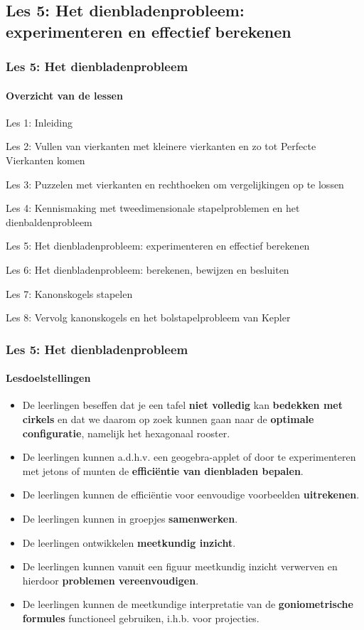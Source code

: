 \documentclass[dutch]{beamer}
\begin{document}
\subsection{Les 5: Het dienbladenprobleem: experimenteren en effectief berekenen}
\begin{frame}
\frametitle{Les 5: Het dienbladenprobleem}
\framesubtitle{Overzicht van de lessen}
\begin{list}{\quad}{}
\item Les 1: Inleiding
\item Les 2: Vullen van vierkanten met kleinere vierkanten en zo tot Perfecte Vierkanten komen
\item Les 3: Puzzelen met vierkanten en rechthoeken om vergelijkingen op te lossen
\item Les 4: Kennismaking met tweedimensionale stapelproblemen en het dienbaldenprobleem 
\item {\color{blue}Les 5: Het dienbladenprobleem: experimenteren en effectief berekenen}
\item Les 6: Het dienbladenprobleem: berekenen, bewijzen en besluiten
\item Les 7: Kanonskogels stapelen
\item Les 8: Vervolg kanonskogels en het bolstapelprobleem van Kepler
\end{list}
\end{frame}

\begin{frame}
\frametitle{Les 5: Het dienbladenprobleem}
\framesubtitle{Lesdoelstellingen}
\begin{itemize}
\item De leerlingen beseffen dat je een tafel \textbf{niet volledig} kan \textbf{bedekken met cirkels} en dat we daarom op zoek kunnen gaan naar de \textbf{optimale configuratie}, namelijk het hexagonaal rooster.
\item De leerlingen kunnen a.d.h.v. een geogebra-applet of door te experimenteren met jetons of munten de \textbf{effici\"{e}ntie van dienbladen bepalen}.
\item De leerlingen kunnen de effici\"{e}ntie voor eenvoudige voorbeelden \textbf{uitrekenen}.
\item De leerlingen kunnen in groepjes \textbf{samenwerken}.
\item De leerlingen ontwikkelen \textbf{meetkundig inzicht}.
\item De leerlingen kunnen vanuit een figuur meetkundig inzicht verwerven en hierdoor \textbf{problemen vereenvoudigen}.
\item De leerlingen kunnen de meetkundige interpretatie van de \textbf{goniometrische formules} functioneel gebruiken, i.h.b. voor projecties.
\end{itemize}
\end{frame}
\end{document}
